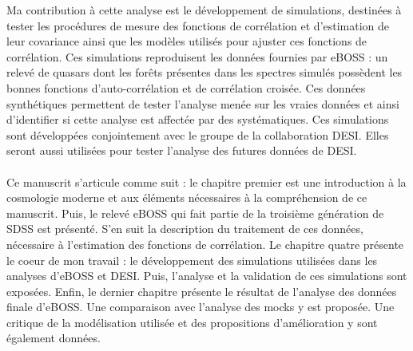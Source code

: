 Ma contribution à cette analyse est le développement de simulations, destinées à tester les procédures de mesure des fonctions de corrélation et d'estimation de leur covariance ainsi que les modèles utilisés pour ajuster ces fonctions de corrélation.
Ces simulations reproduisent les données fournies par eBOSS : un relevé de quasars dont les forêts \lya{} présentes dans les spectres simulés possèdent les bonnes fonctions d'auto-corrélation et de corrélation croisée.
Ces données synthétiques permettent de tester l'analyse menée sur les vraies données et ainsi d'identifier si cette analyse est affectée par des systématiques.
Ces simulations sont développées conjointement avec le groupe \lya{} de la collaboration DESI. Elles seront aussi utilisées pour tester l'analyse des futures données de DESI.

\paragraph{}
Ce manuscrit s'articule comme suit : le chapitre premier est une introduction à la cosmologie moderne et aux éléments nécessaires à la compréhension de ce manuscrit.
Puis, le relevé eBOSS  qui fait partie de la troisième génération de SDSS est présenté.
S'en suit la description du traitement de ces données, nécessaire à l'estimation des fonctions de corrélation.
Le chapitre quatre présente le coeur de mon travail : le développement des simulations utilisées dans les analyses \lya{} d'eBOSS et DESI.
Puis, l'analyse et la validation de ces simulations sont exposées.
Enfin, le dernier chapitre présente le résultat de l'analyse des données finale d'eBOSS. Une comparaison avec l'analyse des mocks y est proposée.
Une critique de la modélisation utilisée et des propositions d'amélioration y sont également données.

